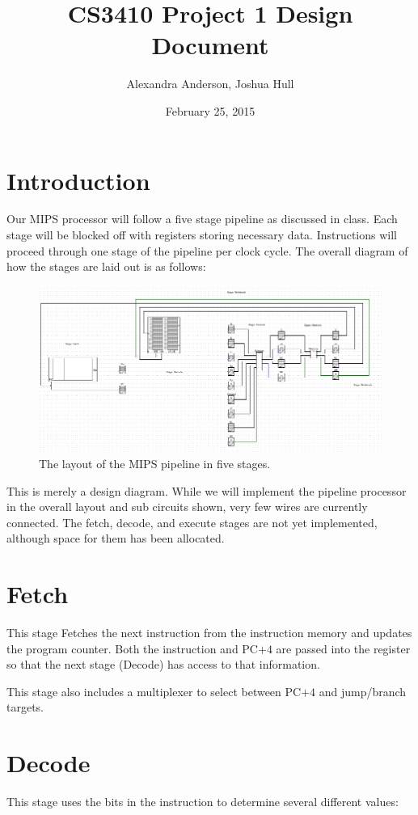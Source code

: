 \documentclass{article}
\title{CS3410 Project 1 Design Document}
\date{February 25, 2015}
\author{Alexandra Anderson, Joshua Hull}
\begin{document}
\maketitle

\section*{Introduction}
Our MIPS processor will follow a five stage pipeline as discussed in class.  Each stage will be blocked off with registers storing necessary data.  Instructions will proceed through one stage of the pipeline per clock cycle. The overall diagram of how the stages are laid out is as follows:

\begin{figure}[h]
	\includegraphics[width = \textwidth]{layout}
	\caption{The layout of the MIPS pipeline in five stages.}
\end{figure}

This is merely a design diagram. While we will implement the pipeline processor in the overall layout and sub circuits shown, very few wires are currently connected. The fetch, decode, and execute stages are not yet implemented, although space for them has been allocated. 

\section*{Fetch}
This stage Fetches the next instruction from the instruction memory and updates the program counter.  Both the instruction and PC$+4$ are passed into the register so that the next stage (Decode) has access to that information.  

This stage also includes a multiplexer to select between PC$+4$ and jump/branch targets.

\section*{Decode}
This stage uses the bits in the instruction to determine several different values:
\end{document}
